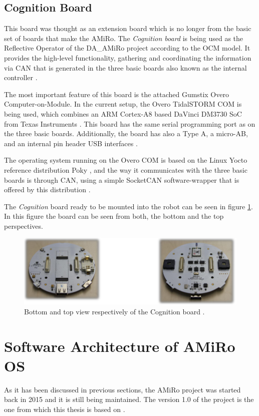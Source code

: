 \documentclass[12pt]{report}%
\begin{document}
\subsection{Cognition Board}
\label{sub:cogn}
This board was thought as an extension board which is no longer from the basic set of boards that make the AMiRo. The \textit{Cognition board} is being used as the Reflective Operator of the DA\_AMiRo project according to the OCM model. It provides the high-level functionality, gathering and coordinating the information via CAN that is generated in the three basic boards also known as the internal controller \cite{AMiRo_paper_modular}.

The most important feature of this board is the attached Gumstix Overo Computer-on-Module. In the current setup, the Overo TidalSTORM COM is being used, which combines an ARM Cortex-A8 based DaVinci DM3730 SoC from Texas Instruments \cite{AMiRo_paper_modular}. This board has the same serial programming port as on the three basic boards. Additionally, the board has also a Type A, a micro-AB, and an internal pin header USB interfaces \cite{AMiRo_paper_modular}.

The operating system running on the Overo COM is based on the Linux Yocto reference distribution Poky \cite{poky}, and the way it communicates with the three basic boards is through CAN, using a simple SocketCAN software-wrapper that is offered by this distribution \cite{AMiRo_paper_modular}.

The \textit{Cognition} board ready to be mounted into the robot can be seen in figure \ref{fig:cogb}. In this figure the board can be seen from both, the bottom and the top perspectives.

\begin{figure}[ht]
	\centering
	\includegraphics[width=\textwidth]{cognition_real}
    \caption{Bottom and top view respectively of the Cognition board \cite{AMiRo_ppt_v2}.}
    \label{fig:cogb}
\end{figure}
\clearpage

\section{Software Architecture of AMiRo OS}
\label{sec:soft}
As it has been discussed in previous sections, the AMiRo project was started back in 2015 and it is still being maintained. The version 1.0 of the project is the one from which this thesis is based on \cite{AMiRo_Git}.
\end{document}
